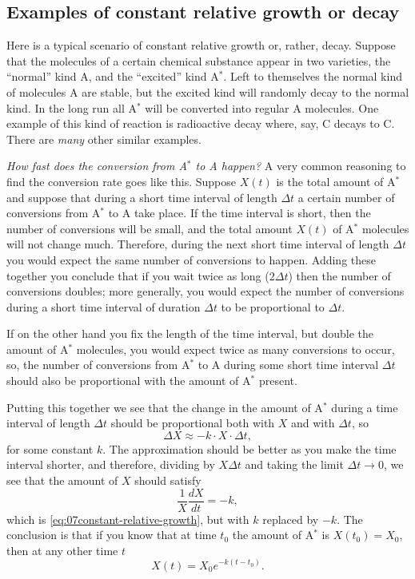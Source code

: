 \subsection{Examples of constant relative growth or decay}
\label{sec:07examples-of-const-relative-growth}
Here is a typical scenario of constant relative growth or, rather,
decay.  Suppose that the molecules of a certain chemical substance
appear in two varieties, the ``normal'' kind A, and the ``excited''
kind A$^*$.  Left to themselves the normal kind of molecules A are
stable, but the excited kind will randomly decay to the normal kind.
In the long run all A$^*$ will be converted into regular A molecules.
One example of this kind of reaction is radioactive decay where, say,
C\raisebox{-3pt}{\footnotesize14} decays to
C\raisebox{-3pt}{\footnotesize12}.  There are \textit{many} other
similar examples.

{\itshape%
  How fast does the conversion from {\upshape A}$^*$ to {\upshape A}
  happen?}  A very common reasoning to find the conversion rate goes
like this.  Suppose $X(t)$ is the total amount of A$^*$ and suppose
that during a short time interval of length $\Delta t$ a certain
number of conversions from A$^*$ to A take place.  If the time
interval is short, then the number of conversions will be small, and
the total amount $X(t)$ of A$^*$ molecules will not change much.
Therefore, during the next short time interval of length $\Delta t$
you would expect the same number of conversions to happen.  Adding
these together you conclude that if you wait twice as long ($2\Delta
t$) then the number of conversions doubles; more generally, you would
expect the number of conversions during a short time interval of
duration $\Delta t$ to be proportional to $\Delta t$.

If on the other hand you fix the length of the time interval, but
double the amount of A$^*$ molecules, you would expect twice as many
conversions to occur, so, the number of conversions from A$^*$ to A
during some short time interval $\Delta t$ should also be proportional
with the amount of A$^*$ present.


Putting this together we see that the change in the amount of A$^*$
during a time interval of length $\Delta t$ should be proportional
both with $X$ and with $\Delta t$, so
\[
\Delta X \approx - k\cdot X\cdot \Delta t,
\]
for some constant $k$.  The approximation should be better as you make
the time interval shorter, and therefore, dividing by $X\Delta t$ and
taking the limit $\Delta t\to0$, we see that the amount of $X$ should
satisfy
\[
\frac{1} {X} \frac{dX} {dt} = -k,
\]
which is \eqref{eq:07constant-relative-growth}, but with $k$ replaced
by $-k$.  The conclusion is that if you know that at time $t_0$ the
amount of A$^*$ is $X(t_0) = X_0$, then at any other time $t$
\[
X(t) = X_0 e^{-k(t-t_0)}.
\]



